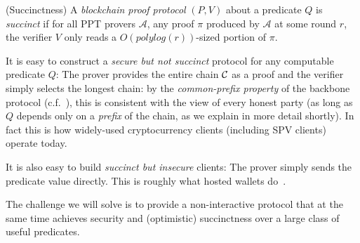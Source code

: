 \begin{definition}{(Succinctness)}
A \emph{blockchain proof protocol} $(P, V)$ about a predicate $Q$ is
\emph{succinct} if for all PPT provers $\mathcal{A}$, any proof $\pi$ produced
by $\mathcal{A}$ at some round $r$, the verifier $V$ only reads a
$O(polylog(r))$-sized portion of $\pi$.
\end{definition}

It is easy to construct a \emph{secure but not succinct} protocol for any
computable predicate $Q$: The prover provides the entire chain $\mathcal{C}$ as a
proof and the verifier simply selects the longest chain: by the
\emph{common-prefix property} of the backbone protocol (c.f.~\cite{backbone}),
this is consistent with the view of every honest party (as long as $Q$ depends
only on a \emph{prefix} of the chain, as we explain in more detail shortly). In
fact this is how widely-used cryptocurrency clients (including SPV clients)
operate today.

It is also easy to build \emph{succinct but insecure} clients: The prover simply
sends the predicate value directly. This is roughly what hosted wallets
do~\cite{sok}.

The challenge we will solve is to provide a non-interactive protocol that at the
same time achieves security and (optimistic) succinctness over a large class of
useful predicates.

